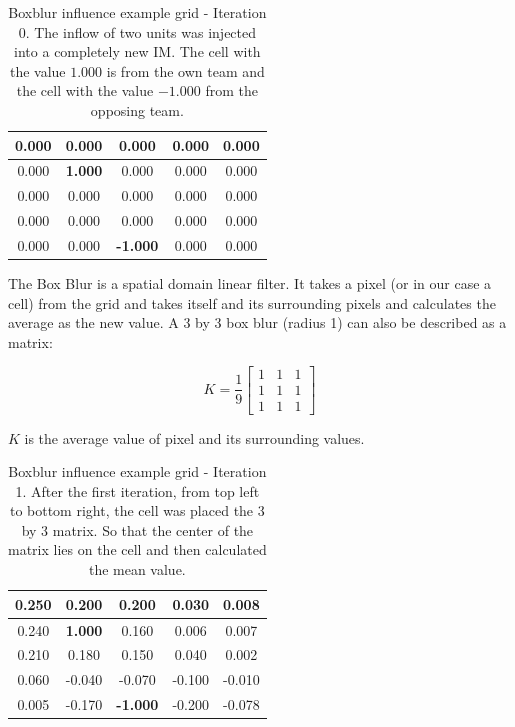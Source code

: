 \documentclass[]{report}
\begin{document}
		\begin{table}[H]
			\centering
			\begin{tabular}{|c|c|c|c|c|}
				\hline
				0.000 & 0.000 & 0.000 & 0.000 & 0.000\\
				\hline
				0.000 & \textbf{1.000} & 0.000 & 0.000 & 0.000\\
				\hline
				0.000 & 0.000 & 0.000 & 0.000 & 0.000\\
				\hline
				0.000 & 0.000 & 0.000 & 0.000 & 0.000\\
				\hline
				0.000 & 0.000 & \textbf{-1.000} & 0.000 & 0.000\\
				\hline
				
			\end{tabular}
			\caption{Boxblur influence example grid - Iteration 0. The inflow of two units was injected into a completely new \ac{IM}. The cell with the value $1.000$ is from the own team and the cell with the value $-1.000$ from the opposing team. }
			\label{tab:Boxblur grid Iteration 0}
		\end{table}
		
		The Box Blur is a spatial domain linear filter. It takes a pixel (or in our case a cell) from the grid and takes itself and its surrounding pixels and calculates the average as the new value. A 3 by 3 box blur (radius 1) can also be described as a matrix:
		
		\begin{equation}
			K = \frac{1}{9}\begin{bmatrix} 1 & 1 & 1\\ 1 & 1 & 1\\ 1 & 1 & 1 \end{bmatrix}
		\end{equation}
	
		$K$ is the average value of pixel and its surrounding values.\citep{boxblur}
		
		\begin{table}[H]
			\centering
			\begin{tabular}{|c|c|c|c|c|}
				\hline
				0.250 & 0.200 & 0.200 & 0.030 & 0.008\\
				\hline
				0.240 & \textbf{1.000} & 0.160 & 0.006 & 0.007\\
				\hline
				0.210 & 0.180 & 0.150 & 0.040 & 0.002\\
				\hline
				0.060 & -0.040 & -0.070 & -0.100 & -0.010\\
				\hline
				0.005 & -0.170 & \textbf{-1.000} & -0.200 & -0.078\\
				\hline
				
			\end{tabular}
			\caption{Boxblur influence example grid - Iteration 1. After the first iteration, from top left to bottom right, the cell was placed the 3 by 3 matrix. So that the center of the matrix lies on the cell and then calculated the mean value.}
			\label{tab:Boxblur grid Iteration 1}
		\end{table}
		
\end{document}
